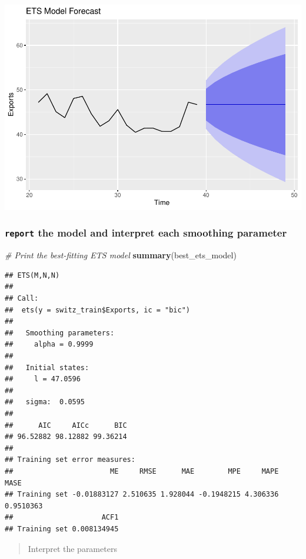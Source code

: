 \documentclass[
]{article}
\newenvironment{Shaded}{\begin{snugshade}}{\end{snugshade}}
\newcommand{\CommentTok}[1]{\textcolor[rgb]{0.56,0.35,0.01}{\textit{#1}}}
\newcommand{\FunctionTok}[1]{\textcolor[rgb]{0.13,0.29,0.53}{\textbf{#1}}}
\newcommand{\NormalTok}[1]{#1}
\begin{document}
\includegraphics{MontgomeryR_Assignment3_files/figure-latex/unnamed-chunk-10-1.pdf}

\hypertarget{report-the-model-and-interpret-each-smoothing-parameter}{%
\subsubsection{\texorpdfstring{\texttt{report} the model and interpret
each smoothing
parameter}{report the model and interpret each smoothing parameter}}\label{report-the-model-and-interpret-each-smoothing-parameter}}

\begin{Shaded}
\begin{Highlighting}[]
\CommentTok{\# Print the best{-}fitting ETS model}
\FunctionTok{summary}\NormalTok{(best\_ets\_model)}
\end{Highlighting}
\end{Shaded}

\begin{verbatim}
## ETS(M,N,N) 
## 
## Call:
##  ets(y = switz_train$Exports, ic = "bic") 
## 
##   Smoothing parameters:
##     alpha = 0.9999 
## 
##   Initial states:
##     l = 47.0596 
## 
##   sigma:  0.0595
## 
##      AIC     AICc      BIC 
## 96.52882 98.12882 99.36214 
## 
## Training set error measures:
##                       ME     RMSE      MAE        MPE     MAPE      MASE
## Training set -0.01883127 2.510635 1.928044 -0.1948215 4.306336 0.9510363
##                     ACF1
## Training set 0.008134945
\end{verbatim}

\begin{quote}
Interpret the parameters
\end{quote}
\end{document}
